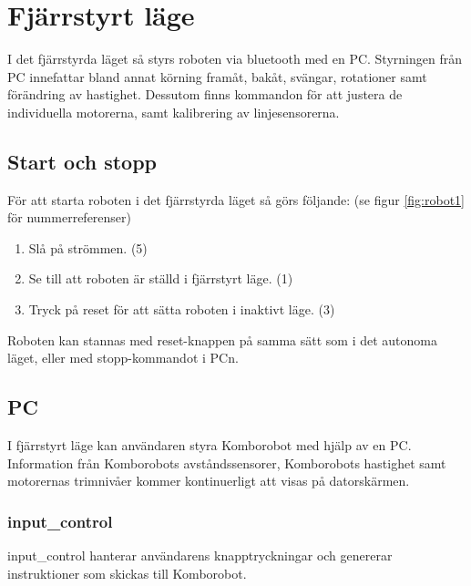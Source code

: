 
%
%


\section{Fjärrstyrt läge}
I det fjärrstyrda läget så styrs roboten via bluetooth med en PC. Styrningen från PC innefattar bland annat körning framåt, bakåt, svängar, rotationer samt 
förändring av hastighet. Dessutom finns kommandon för att justera de individuella motorerna, samt kalibrering av linjesensorerna. 

\subsection{Start och stopp}
För att starta roboten i det fjärrstyrda läget så görs följande: (se figur \ref{fig:robot1} för nummerreferenser)

\begin{enumerate}
\item Slå på strömmen. (5)
\item Se till att roboten är ställd i fjärrstyrt läge. (1)
\item Tryck på reset för att sätta roboten i inaktivt läge. (3)
\end{enumerate}

Roboten kan stannas med reset-knappen på samma sätt som i det autonoma läget, eller med stopp-kommandot i PCn. 

\subsection{PC}
I fjärrstyrt läge kan användaren styra Komborobot med hjälp av en PC.
Information från Komborobots avståndssensorer, Komborobots hastighet samt
motorernas trimnivåer kommer kontinuerligt att visas på datorskärmen.
\subsubsection{input\_control}
input\_control hanterar användarens knapptryckningar och genererar instruktioner
som skickas till Komborobot.

